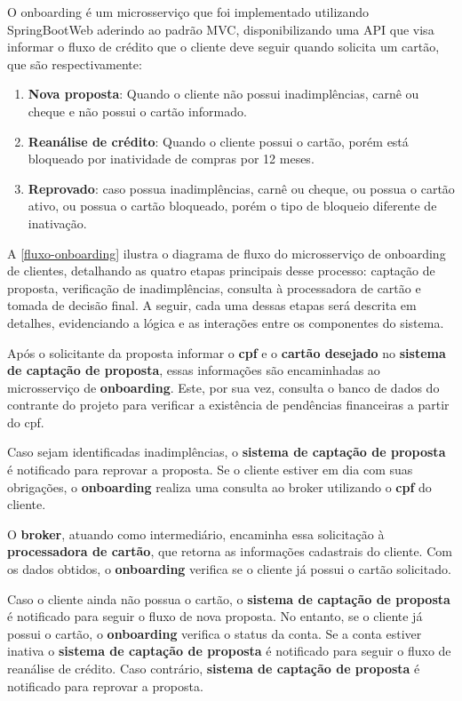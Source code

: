 O onboarding é um microsserviço que foi implementado utilizando SpringBootWeb aderindo ao padrão MVC, disponibilizando 
uma API que visa informar o fluxo de crédito que o cliente deve seguir quando solicita um cartão, 
que são respectivamente: 
\begin{enumerate}
    \item \textbf{Nova proposta}: Quando o cliente não possui inadimplências, carnê ou cheque e não possui o cartão informado. 					
    \item \textbf{Reanálise de crédito}: Quando o cliente possui o cartão, porém está bloqueado por inatividade de compras por 12 meses.
    \item \textbf{Reprovado}: caso possua inadimplências, carnê ou cheque, ou possua o cartão ativo, ou possua o cartão bloqueado, porém o tipo de bloqueio diferente de inativação. 
\end{enumerate}

A \autoref{fluxo-onboarding} ilustra o diagrama de fluxo do microsserviço de onboarding de clientes, detalhando as 
quatro etapas principais desse processo: captação de proposta, verificação de 
inadimplências, consulta à processadora de cartão e tomada de decisão final. 
A seguir, cada uma dessas etapas será descrita em detalhes, evidenciando a lógica e as interações entre os componentes do sistema.

Após o solicitante da proposta informar o \textbf{cpf} e o \textbf{cartão desejado} no 
\textbf{sistema de captação de proposta}, essas informações são
encaminhadas ao microsserviço de \textbf{onboarding}. Este, por sua vez, 
consulta o banco de dados do contrante do projeto para verificar a existência de 
pendências financeiras a partir do cpf. 

Caso sejam identificadas inadimplências, o \textbf{sistema de captação de proposta} é notificado para reprovar a proposta.
Se o cliente estiver em dia com suas obrigações, o \textbf{onboarding} realiza uma consulta ao broker utilizando o \textbf{cpf} do cliente. 

O \textbf{broker}, atuando como intermediário, encaminha essa solicitação à \textbf{processadora de cartão},
que retorna as informações cadastrais do cliente. Com os dados obtidos, o \textbf{onboarding} verifica se o cliente já possui o cartão solicitado.

Caso o cliente ainda não possua o cartão, o \textbf{sistema de captação de proposta} é notificado para seguir o 
fluxo de nova proposta. No entanto, se o cliente já possui o cartão, 
o \textbf{onboarding} verifica o status da conta. Se a conta estiver inativa o 
\textbf{sistema de captação de proposta} é notificado para seguir o fluxo de reanálise de crédito. 
Caso contrário, \textbf{sistema de captação de proposta} é notificado para reprovar a proposta.

